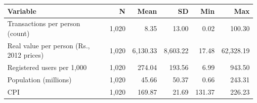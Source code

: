 \begin{tabular}{lrrrrr}
\toprule
Variable & N & Mean & SD & Min & Max \\
\midrule
Transactions per person (count) & 1,020 & 8.35 & 13.00 & 0.02 & 100.30 \\
Real value per person (Rs., 2012 prices) & 1,020 & 6,130.33 & 8,603.22 & 17.48 & 62,328.19 \\
Registered users per 1,000 & 1,020 & 274.04 & 193.56 & 6.99 & 943.50 \\
Population (millions) & 1,020 & 45.66 & 50.37 & 0.66 & 243.31 \\
CPI & 1,020 & 169.87 & 21.69 & 131.37 & 226.23 \\
\bottomrule
\end{tabular}
